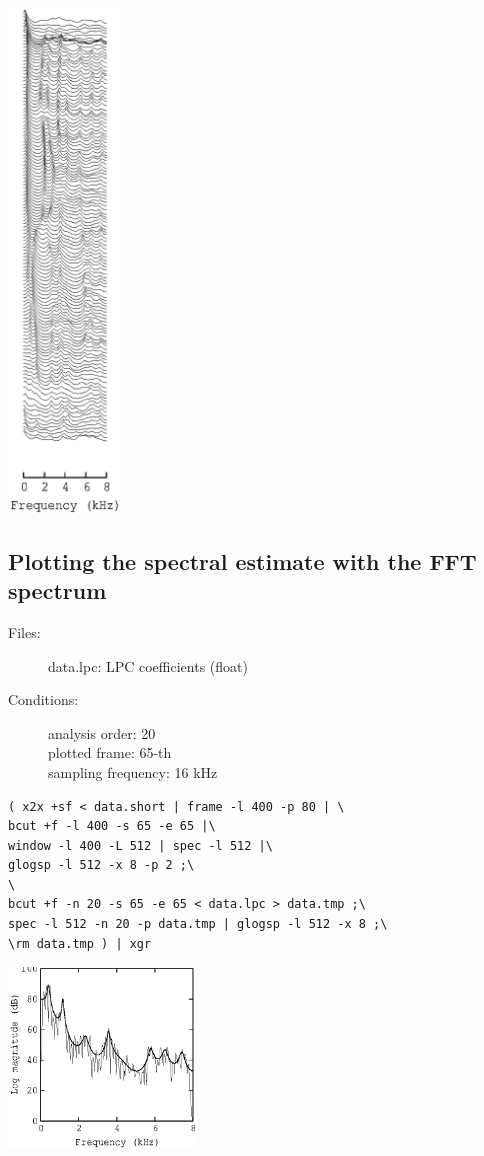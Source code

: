 \documentclass[a4paper,10pt]{article}
\begin{document}
\includegraphics[width=3cm]{eps/data.lpc.grlogsp.eps}

\subsection{Plotting the spectral estimate with the FFT spectrum}

\begin{description}
\item[Files:]
  data.lpc: LPC coefficients (float)
\item[Conditions:]
  analysis order: 20\\
  plotted frame: 65-th\\
  sampling frequency: 16 kHz
\end{description}

\begin{verbatim}
( x2x +sf < data.short | frame -l 400 -p 80 | \
bcut +f -l 400 -s 65 -e 65 |\
window -l 400 -L 512 | spec -l 512 |\
glogsp -l 512 -x 8 -p 2 ;\
\
bcut +f -n 20 -s 65 -e 65 < data.lpc > data.tmp ;\
spec -l 512 -n 20 -p data.tmp | glogsp -l 512 -x 8 ;\
\rm data.tmp ) | xgr
\end{verbatim}

\includegraphics[width=5cm]{eps/data.lpc.glogsp.eps}
\end{document}
